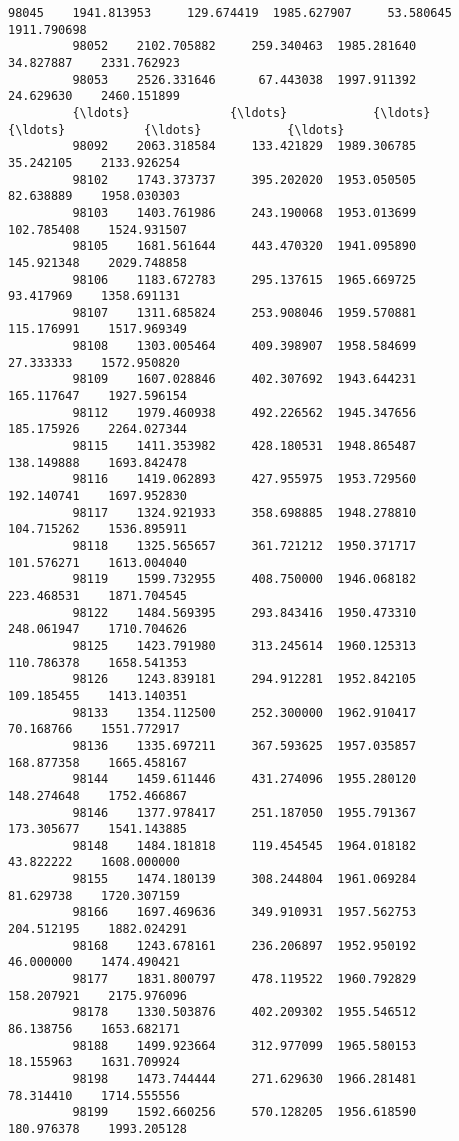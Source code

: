 \documentclass[11pt]{article}
\begin{document}
\begin{Verbatim}[commandchars=\\\{\}]
         98045    1941.813953     129.674419  1985.627907     53.580645    1911.790698   
         98052    2102.705882     259.340463  1985.281640     34.827887    2331.762923   
         98053    2526.331646      67.443038  1997.911392     24.629630    2460.151899   
         {\ldots}              {\ldots}            {\ldots}          {\ldots}           {\ldots}            {\ldots}   
         98092    2063.318584     133.421829  1989.306785     35.242105    2133.926254   
         98102    1743.373737     395.202020  1953.050505     82.638889    1958.030303   
         98103    1403.761986     243.190068  1953.013699    102.785408    1524.931507   
         98105    1681.561644     443.470320  1941.095890    145.921348    2029.748858   
         98106    1183.672783     295.137615  1965.669725     93.417969    1358.691131   
         98107    1311.685824     253.908046  1959.570881    115.176991    1517.969349   
         98108    1303.005464     409.398907  1958.584699     27.333333    1572.950820   
         98109    1607.028846     402.307692  1943.644231    165.117647    1927.596154   
         98112    1979.460938     492.226562  1945.347656    185.175926    2264.027344   
         98115    1411.353982     428.180531  1948.865487    138.149888    1693.842478   
         98116    1419.062893     427.955975  1953.729560    192.140741    1697.952830   
         98117    1324.921933     358.698885  1948.278810    104.715262    1536.895911   
         98118    1325.565657     361.721212  1950.371717    101.576271    1613.004040   
         98119    1599.732955     408.750000  1946.068182    223.468531    1871.704545   
         98122    1484.569395     293.843416  1950.473310    248.061947    1710.704626   
         98125    1423.791980     313.245614  1960.125313    110.786378    1658.541353   
         98126    1243.839181     294.912281  1952.842105    109.185455    1413.140351   
         98133    1354.112500     252.300000  1962.910417     70.168766    1551.772917   
         98136    1335.697211     367.593625  1957.035857    168.877358    1665.458167   
         98144    1459.611446     431.274096  1955.280120    148.274648    1752.466867   
         98146    1377.978417     251.187050  1955.791367    173.305677    1541.143885   
         98148    1484.181818     119.454545  1964.018182     43.822222    1608.000000   
         98155    1474.180139     308.244804  1961.069284     81.629738    1720.307159   
         98166    1697.469636     349.910931  1957.562753    204.512195    1882.024291   
         98168    1243.678161     236.206897  1952.950192     46.000000    1474.490421   
         98177    1831.800797     478.119522  1960.792829    158.207921    2175.976096   
         98178    1330.503876     402.209302  1955.546512     86.138756    1653.682171   
         98188    1499.923664     312.977099  1965.580153     18.155963    1631.709924   
         98198    1473.744444     271.629630  1966.281481     78.314410    1714.555556   
         98199    1592.660256     570.128205  1956.618590    180.976378    1993.205128   
         

\end{Verbatim}
\end{document}
